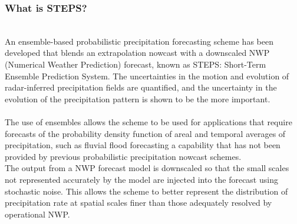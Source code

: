 \documentclass[../paper.tex]{subfiles}
\begin{document}
    \subsubsection{What is STEPS?}
        \hfill\\
        An ensemble-based probabilistic precipitation forecasting scheme has been developed that blends an extrapolation nowcast with a downscaled NWP
        (Numerical Weather Prediction) forecast,
        known as STEPS: Short-Term Ensemble Prediction System.
        The uncertainties in the motion and evolution of radar-inferred precipitation fields are quantified,
        and the uncertainty in the evolution of the precipitation pattern is shown to be the more important. \\\\
        The use of ensembles allows the scheme
        to be used for applications
        that require forecasts of the probability density function of areal and temporal averages of precipitation,
        such as fluvial flood forecasting a capability
        that has not been provided by previous probabilistic precipitation nowcast schemes. \\
        The output from a NWP forecast model is downscaled
        so that the small scales not represented accurately by the model are injected into the forecast
        using stochastic noise.
        This allows the scheme
        to better represent the distribution of precipitation rate at spatial scales finer than those
        adequately resolved by operational NWP\@.
\end{document}
